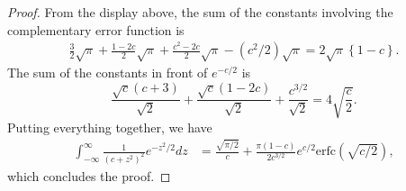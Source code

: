 \documentclass[10pt,a4paper]{amsart}
\begin{document}
\begin{proof}
From the display above, the sum of the constants involving the complementary error function is
\begin{equation*}
    \begin{aligned}
        \frac{3}{2}\sqrt{\pi} +\frac{1-2c}{2}\sqrt{\pi} + \frac{c^2-2c}{2}\sqrt{\pi} - (c^2/2)\sqrt{\pi} = 2\sqrt{\pi}\left\{1-c\right\}.
    \end{aligned}
\end{equation*}
The sum of the constants in front of $e^{-c/2}$ is
\begin{equation*}
    \frac{\sqrt{c}(c+3)}{\sqrt{2}} + \frac{\sqrt{c}(1-2c)}{\sqrt{2}} + \frac{c^{3/2}}{\sqrt{2}} = 4\sqrt{\frac{c}{2}}.
\end{equation*}
Putting everything together, we have
\begin{equation*}
\begin{aligned}
    \int_{-\infty}^\infty \frac{1}{(c + z^2)^{2}}e^{-z^2/2} dz &= \frac{\sqrt{\pi/2}}{c} + \frac{\pi(1-c)}{2c^{3/2}}e^{c/2}\mathrm{erfc}(\sqrt{c/2}),
\end{aligned}
\end{equation*}
which concludes the proof.
\end{proof}
\end{document}
